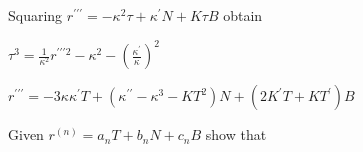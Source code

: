\documentclass[11pt]{amsbook}
\begin{document}
\begin{hEnumerateArabic}
  \item
  Squaring $r^{\prime\prime\prime} = -\kappa^2\tau + \kappa^\prime N + K\tau B$ obtain 
  \begin{hEnumerateAlpha}
    \item
    $\tau^3 = \frac{1}{\kappa^2} r^{\prime \prime \prime2} - \kappa^2 - (\frac{\kappa^\prime}{\kappa})^2$
    \item
    $r^{\prime\prime\prime} = -3\kappa\kappa^\prime T +(\kappa^{\prime\prime} - \kappa^3 - KT^2)N + (2K^\prime T + KT^\prime)B$
  \end{hEnumerateAlpha}
  
  \item
  Given $r^{(n)} = a_nT + b_nN + c_nB$ show that

 \end{hEnumerateArabic}
% 



\end{document}
